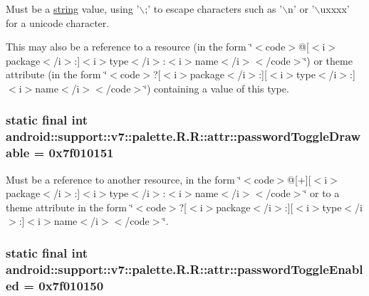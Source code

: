 Must be a \hyperlink{classandroid_1_1support_1_1v7_1_1palette_1_1_r_1_1string}{string} value, using '$\backslash$;' to escape characters such as '$\backslash$n' or '$\backslash$uxxxx' for a unicode character. 

This may also be a reference to a resource (in the form \char`\"{}$<$code$>$@\mbox{[}$<$i$>$package$<$/i$>$:\mbox{]}$<$i$>$type$<$/i$>$:$<$i$>$name$<$/i$>$$<$/code$>$\char`\"{}) or theme attribute (in the form \char`\"{}$<$code$>$?\mbox{[}$<$i$>$package$<$/i$>$:\mbox{]}\mbox{[}$<$i$>$type$<$/i$>$:\mbox{]}$<$i$>$name$<$/i$>$$<$/code$>$\char`\"{}) containing a value of this type. \hypertarget{classandroid_1_1support_1_1v7_1_1palette_1_1_r_1_1attr_9c468adab23cccb920461c58ec49d587}{
\subsubsection[{passwordToggleDrawable}]{\setlength{\rightskip}{0pt plus 5cm}static final int android::support::v7::palette.R.R::attr::passwordToggleDrawable = 0x7f010151}}
\label{classandroid_1_1support_1_1v7_1_1palette_1_1_r_1_1attr_9c468adab23cccb920461c58ec49d587}


Must be a reference to another resource, in the form \char`\"{}$<$code$>$@\mbox{[}+\mbox{]}\mbox{[}$<$i$>$package$<$/i$>$:\mbox{]}$<$i$>$type$<$/i$>$:$<$i$>$name$<$/i$>$$<$/code$>$\char`\"{} or to a theme attribute in the form \char`\"{}$<$code$>$?\mbox{[}$<$i$>$package$<$/i$>$:\mbox{]}\mbox{[}$<$i$>$type$<$/i$>$:\mbox{]}$<$i$>$name$<$/i$>$$<$/code$>$\char`\"{}. \hypertarget{classandroid_1_1support_1_1v7_1_1palette_1_1_r_1_1attr_ff73cc04594edf7dea8b027c95b710a9}{
\subsubsection[{passwordToggleEnabled}]{\setlength{\rightskip}{0pt plus 5cm}static final int android::support::v7::palette.R.R::attr::passwordToggleEnabled = 0x7f010150}}
\label{classandroid_1_1support_1_1v7_1_1palette_1_1_r_1_1attr_ff73cc04594edf7dea8b027c95b710a9}


